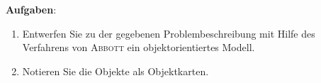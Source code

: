 \documentclass[11pt, a4paper]{article}
\begin{document}
\vfill
\textbf{Aufgaben}:
\begin{enumerate}
\item Entwerfen Sie zu der gegebenen Problembeschreibung mit Hilfe des Verfahrens von \textsc{Abbott} ein objektorientiertes Modell. 

\item Notieren Sie die Objekte als Objektkarten.



\end{enumerate}


\end{document}
